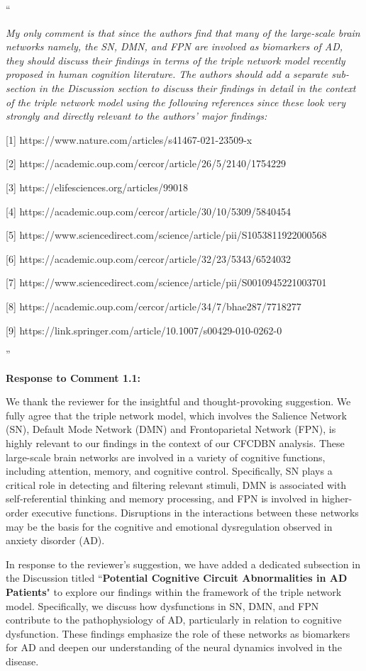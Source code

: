 \documentclass[12pt,technote,onecolumn]{IEEEtran}
\begin{document}
 ``{\it My only comment is that since the authors find that many of the large-scale brain networks namely, the SN, DMN, and FPN are involved as biomarkers of AD, they should discuss their findings in terms of the triple network model recently proposed in human cognition literature. The authors should add a separate sub-section in the Discussion section to discuss their findings in detail in the context of the triple network model using the following references since these look very strongly and directly relevant to the authors' major findings:  

[1] https://www.nature.com/articles/s41467-021-23509-x  

[2] https://academic.oup.com/cercor/article/26/5/2140/1754229  

[3] https://elifesciences.org/articles/99018  

[4] https://academic.oup.com/cercor/article/30/10/5309/5840454  

[5] https://www.sciencedirect.com/science/article/pii/S1053811922000568  

[6] https://academic.oup.com/cercor/article/32/23/5343/6524032  

[7] https://www.sciencedirect.com/science/article/pii/S0010945221003701  

[8] https://academic.oup.com/cercor/article/34/7/bhae287/7718277  

[9] https://link.springer.com/article/10.1007/s00429-010-0262-0  
}''
\vspace{1mm}

\noindent \textbf{Response to Comment 1.1:} 

We thank the reviewer for the insightful and thought-provoking suggestion. We fully agree that the triple network model, which involves the Salience Network (SN), Default Mode Network (DMN) and Frontoparietal Network (FPN), is highly relevant to our findings in the context of our CFCDBN analysis. These large-scale brain networks are involved in a variety of cognitive functions, including attention, memory, and cognitive control. Specifically, SN plays a critical role in detecting and filtering relevant stimuli, DMN is associated with self-referential thinking and memory processing, and FPN is involved in higher-order executive functions. Disruptions in the interactions between these networks may be the basis for the cognitive and emotional dysregulation observed in anxiety disorder (AD).  

In response to the reviewer’s suggestion, we have added a dedicated subsection in the Discussion titled ``\textbf{Potential Cognitive Circuit Abnormalities in AD Patients}" to explore our findings within the framework of the triple network model. Specifically, we discuss how dysfunctions in SN, DMN, and FPN contribute to the pathophysiology of AD, particularly in relation to cognitive dysfunction. These findings emphasize the role of these networks as biomarkers for AD and deepen our understanding of the neural dynamics involved in the disease. 
\end{document}
